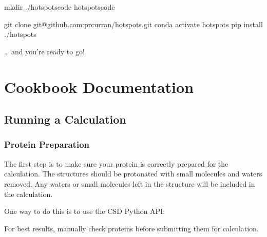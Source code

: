 \documentclass[letterpaper,10pt,english]{sphinxmanual}
\begin{document}
\begin{sphinxVerbatim}[commandchars=\\\{\}]
mkdir ./hotspots\PYGZus{}code
 hotspots\PYGZus{}code

git clone git@github.com:prcurran/hotspots.git
conda activate hotspots
pip install ./hotspots
\end{sphinxVerbatim}

… and you’re ready to go!


\chapter{Cookbook Documentation}
\label{\detokenize{tutorial:cookbook-documentation}}

\section{Running a Calculation}
\label{\detokenize{tutorial:running-a-calculation}}

\subsection{Protein Preparation}
\label{\detokenize{tutorial:protein-preparation}}
The first step is to make sure your protein is correctly prepared for the calculation. The structures should be
protonated with small molecules and waters removed. Any waters or small molecules left in the structure will be included
in the calculation.

One way to do this is to use the CSD Python API:

\begin{sphinxVerbatim}[commandchars=\\\{\}]
   

  
   
\end{sphinxVerbatim}

For best results, manually check proteins before submitting them for calculation.
\end{document}
